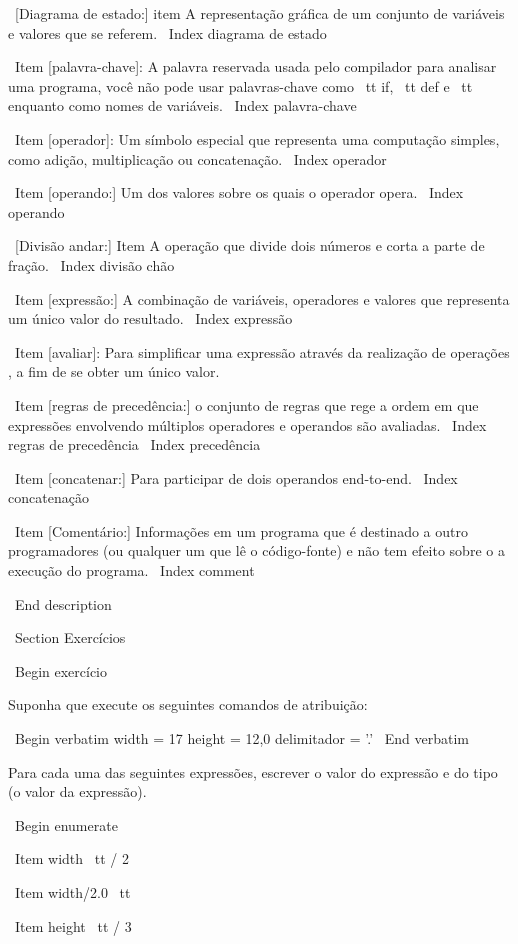 \documentclass[10pt]{book}
\begin{document}
{\ [Diagrama de estado:] item A representação gráfica de um conjunto de variáveis ​​e
valores que se referem.
\ Index {diagrama de estado}

\ Item [palavra-chave]: A palavra reservada usada pelo compilador para analisar uma
programa, você não pode usar palavras-chave como {\ tt if}, {\ tt def} e {\ tt enquanto} como
nomes de variáveis.
\ Index {palavra-chave}

\ Item [operador]: Um símbolo especial que representa uma computação simples, como
adição, multiplicação ou concatenação.
\ Index {operador}

\ Item [operando:] Um dos valores sobre os quais o operador opera.
\ Index {operando}

\ [Divisão andar:] Item A operação que divide dois números e corta
a parte de fração.
\ Index {divisão chão}

\ Item [expressão:] A combinação de variáveis, operadores e valores que
representa um único valor do resultado.
\ Index {expressão}

\ Item [avaliar]: Para simplificar uma expressão através da realização de operações
, a fim de se obter um único valor.

\ Item [regras de precedência:] o conjunto de regras que rege a ordem em que
expressões envolvendo múltiplos operadores e operandos são avaliadas.
\ Index {regras de precedência}
\ Index {} precedência

\ Item [concatenar:] Para participar de dois operandos end-to-end.
\ Index {concatenação}

\ Item [Comentário:] Informações em um programa que é destinado a outro
programadores (ou qualquer um que lê o código-fonte) e não tem efeito sobre o
a execução do programa.
\ Index {comment}

\ End {description}


\ Section {Exercícios}

\ Begin {} exercício

Suponha que execute os seguintes comandos de atribuição:

\ Begin {verbatim}
width = 17
height = 12,0
delimitador = '.'
\ End {verbatim}

Para cada uma das seguintes expressões, escrever o valor do
expressão e do tipo (o valor da expressão).

\ Begin {enumerate}

\ Item {width \ tt / 2}

\ Item {width/2.0 \ tt}

\ Item {height \ tt / 3}

}
\end{document}
